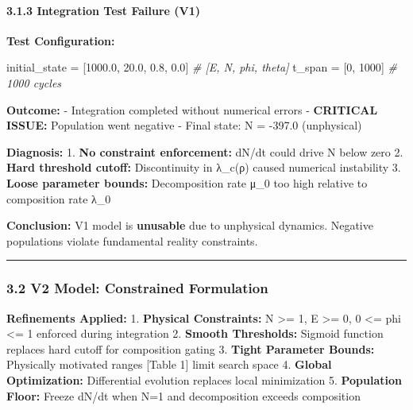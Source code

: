\documentclass[
]{article}
\newenvironment{Shaded}{}{}
\newcommand{\CommentTok}[1]{\textcolor[rgb]{0.38,0.63,0.69}{\textit{#1}}}
\newcommand{\DecValTok}[1]{\textcolor[rgb]{0.25,0.63,0.44}{#1}}
\newcommand{\FloatTok}[1]{\textcolor[rgb]{0.25,0.63,0.44}{#1}}
\newcommand{\NormalTok}[1]{#1}
\newcommand{\OperatorTok}[1]{\textcolor[rgb]{0.40,0.40,0.40}{#1}}
\begin{document}
\paragraph{3.1.3 Integration Test Failure
(V1)}\label{integration-test-failure-v1}

\textbf{Test Configuration:}

\begin{Shaded}
\begin{Highlighting}[]
\NormalTok{initial\_state }\OperatorTok{=}\NormalTok{ [}\FloatTok{1000.0}\NormalTok{, }\FloatTok{20.0}\NormalTok{, }\FloatTok{0.8}\NormalTok{, }\FloatTok{0.0}\NormalTok{]  }\CommentTok{\# [E, N, phi, theta]}
\NormalTok{t\_span }\OperatorTok{=}\NormalTok{ [}\DecValTok{0}\NormalTok{, }\DecValTok{1000}\NormalTok{]  }\CommentTok{\# 1000 cycles}
\end{Highlighting}
\end{Shaded}

\textbf{Outcome:} - Integration completed without numerical errors -
\textbf{CRITICAL ISSUE:} Population went negative - Final state: N =
-397.0 (unphysical)

\textbf{Diagnosis:} 1. \textbf{No constraint enforcement:} dN/dt could
drive N below zero 2. \textbf{Hard threshold cutoff:} Discontinuity in
λ\_c(ρ) caused numerical instability 3. \textbf{Loose parameter bounds:}
Decomposition rate μ\_0 too high relative to composition rate λ\_0

\textbf{Conclusion:} V1 model is \textbf{unusable} due to unphysical
dynamics. Negative populations violate fundamental reality constraints.

\begin{center}\rule{0.5\linewidth}{0.5pt}\end{center}

\subsubsection{3.2 V2 Model: Constrained
Formulation}\label{v2-model-constrained-formulation}

\textbf{Refinements Applied:} 1. \textbf{Physical Constraints:} N
\textgreater= 1, E \textgreater= 0, 0 \textless= phi \textless= 1
enforced during integration 2. \textbf{Smooth Thresholds:} Sigmoid
function replaces hard cutoff for composition gating 3. \textbf{Tight
Parameter Bounds:} Physically motivated ranges {[}Table 1{]} limit
search space 4. \textbf{Global Optimization:} Differential evolution
replaces local minimization 5. \textbf{Population Floor:} Freeze dN/dt
when N=1 and decomposition exceeds composition
\end{document}

